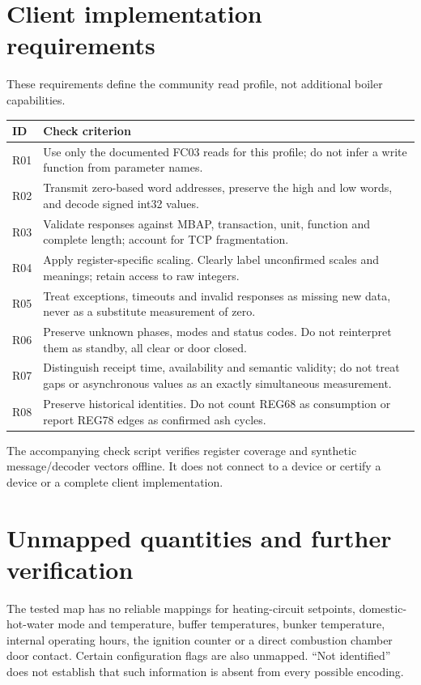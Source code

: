 \documentclass[10pt,a4paper]{article}
\begin{document}
\section{Client implementation requirements}
These requirements define the community read profile, not additional boiler capabilities.
\begin{longtable}{@{}L{13mm}L{151mm}@{}}
\toprule\textbf{ID}&\textbf{Check criterion}\\\midrule\endhead
R01 & Use only the documented FC03 reads for this profile; do not infer a write function from parameter names.\\
R02 & Transmit zero-based word addresses, preserve the high and low words, and decode signed int32 values.\\
R03 & Validate responses against MBAP, transaction, unit, function and complete length; account for TCP fragmentation.\\
R04 & Apply register-specific scaling. Clearly label unconfirmed scales and meanings; retain access to raw integers.\\
R05 & Treat exceptions, timeouts and invalid responses as missing new data, never as a substitute measurement of zero.\\
R06 & Preserve unknown phases, modes and status codes. Do not reinterpret them as standby, all clear or door closed.\\
R07 & Distinguish receipt time, availability and semantic validity; do not treat gaps or asynchronous values as an exactly simultaneous measurement.\\
R08 & Preserve historical identities. Do not count REG68 as consumption or report REG78 edges as confirmed ash cycles.\\\bottomrule
\end{longtable}
The accompanying check script verifies register coverage and synthetic message/decoder vectors offline. It does not connect to a device or certify a device or a complete client implementation.

\section{Unmapped quantities and further verification}
The tested map has no reliable mappings for heating-circuit setpoints, domestic-hot-water mode and temperature, buffer temperatures, bunker temperature, internal operating hours, the ignition counter or a direct combustion chamber door contact. Certain configuration flags are also unmapped. ``Not identified'' does not establish that such information is absent from every possible encoding.
\end{document}
